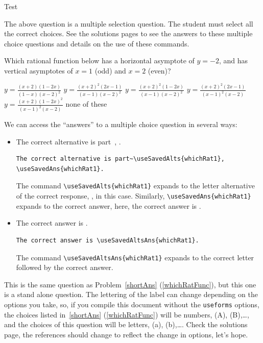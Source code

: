 \documentclass{article}
\begin{document}
\begin{exam}{Test\nExam}
\begin{theseproblems}
\begin{eqComments}[Comments:]
The above question is a multiple selection question. The student must
select all the correct choices. See the solutions pages to see the answers
to these multiple choice questions and details on the use of these
commands.
\end{eqComments}

\begin{problem}[5]
Which rational function below has a horizontal asymptote of
    $y=-2$, and has vertical asymptotes of $x=1$ (odd) and $ x=2 $ (even)?
    \begin{answers}{3}\rowsep{6pt}
    \bChoices[label=whichRat1]
         $ y = \frac{(x+2) (1-2x)}{(1-x)(x-2)^2} $\eAns
         $ y = \frac{(x+2)^2 (2x-1)}{(x-1)(x-2)^2} $\eAns
         $ y = \frac{(x+2)^2 (1-2x)}{(x-1)(x-2)^2} $\eAns
         $ y = \frac{(x+2)^2 (2x-1)}{(x-1)^2(x-2)} $\eAns
         $ y = \frac{(x+2) (1-2x)^2}{(x-1)^2(x-2)} $\eAns
         none of these\eAns
    \eChoices
    \end{answers}
\begin{solution}[]\ifvspacewithsolns
We can access the ``answers'' to a multiple choice question in several
ways:
\begin{itemize}
\item The correct alternative is part~,
.
\begin{verbatim}
The correct alternative is part~\useSavedAlts{whichRat1},
\useSavedAns{whichRat1}.
\end{verbatim}
The command \verb!\useSavedAlts{whichRat1}! expands to the letter alternative of the
correct response, , in this case. Similarly,
\verb!\useSavedAns{whichRat1}! expands to the correct answer, here, the
correct answer is .

\item The correct answer is .
\begin{verbatim}
The correct answer is \useSavedAltsAns{whichRat1}.
\end{verbatim}
The command \verb!\useSavedAltsAns{whichRat1}! expands to the correct
letter followed by the correct answer.
\end{itemize}\fi
\end{solution}
\end{problem}

\begin{eqComments}[Comments:]
This is the same question as Problem~\ref{shortAns} (\ref{whichRatFunc}),
but this one is a stand alone question.  The lettering of the label can
change depending on the options you take, so, if you compile this document
without the \texttt{useforms} options, the choices listed in~\ref{shortAns} (\ref{whichRatFunc})
will be numbers, (A), (B),\dots, and the choices of this question will be
letters, (a), (b),\dots. Check the solutions page, the references should
change to reflect the change in options, let's hope.
\end{eqComments}


\end{theseproblems}
\end{exam}
\end{document}
